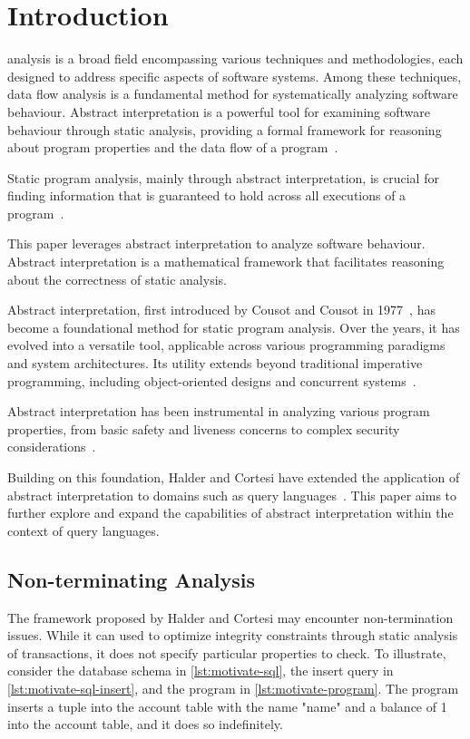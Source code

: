 \section{Introduction}\label{sec:introduction}
 analysis is a broad field encompassing various techniques and methodologies, each designed to address specific aspects of software systems.
Among these techniques, data flow analysis is a fundamental method for systematically analyzing software behaviour.
Abstract interpretation is a powerful tool for examining software behaviour through static analysis, providing a formal framework for reasoning about program properties and the data flow of a program~\cite{cousot_abstract_1977}.

Static program analysis, mainly through abstract interpretation, is crucial for finding information that is guaranteed to hold across all executions of a program~\cite{jackson_software_2000}.


This paper leverages abstract interpretation to analyze software behaviour.
Abstract interpretation is a mathematical framework that facilitates reasoning about the correctness of static analysis.

Abstract interpretation, first introduced by Cousot and Cousot in 1977~\cite{cousot_abstract_1977}, has become a foundational method for static program analysis.
Over the years, it has evolved into a versatile tool, applicable across various programming paradigms and system architectures.
Its utility extends beyond traditional imperative programming, including object-oriented designs and concurrent systems~\cite{gustafsson_analyzing_2013, mine_static_2023}.

Abstract interpretation has been instrumental in analyzing various program properties, from basic safety and liveness concerns to complex security considerations~\cite{mastroeni_abstract_2011}.

Building on this foundation, Halder and Cortesi have extended the application of abstract interpretation to domains such as query languages~\cite{halder_abstract_2012}.
This paper aims to further explore and expand the capabilities of abstract interpretation within the context of query languages.


\subsection{Non-terminating Analysis}\label{subsec:non-terminating-analysis}
The framework proposed by Halder and Cortesi may encounter non-termination issues.
While it can used to optimize integrity constraints through static analysis of transactions, it does not specify particular properties to check.
To illustrate, consider the database schema in \autoref{lst:motivate-sql}, the insert query in \autoref{lst:motivate-sql-insert}, and the program in \autoref{lst:motivate-program}.
The program inserts a tuple into the account table with the name "name" and a balance of 1 into the account table, and it does so indefinitely.


